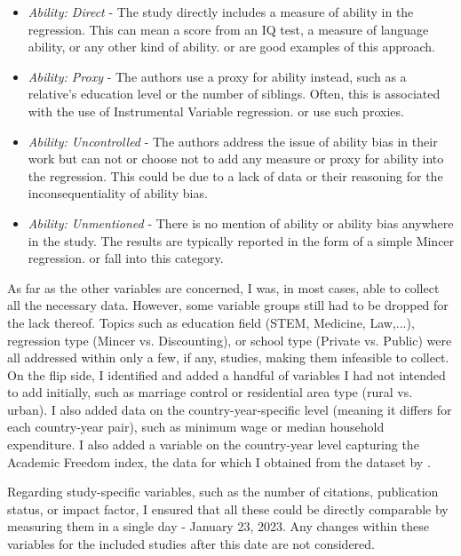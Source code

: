 \begin{itemize}
    \item \textit{Ability: Direct} - The study directly includes a measure of ability in the regression. This can mean a score from an IQ test, a measure of language ability, or any other kind of ability. \cite{grogger1995changes} or \cite{vanpraag2013higher} are good examples of this approach.
    \item \textit{Ability: Proxy} - The authors use a proxy for ability instead, such as a relative's education level or the number of siblings. Often, this is associated with the use of Instrumental Variable regression. \cite{card1995using} or \cite{debrauw2008reconciling} use such proxies.
    \item \textit{Ability: Uncontrolled} - The authors address the issue of ability bias in their work but can not or choose not to add any measure or proxy for ability into the regression. This could be due to a lack of data or their reasoning for the inconsequentiality of ability bias. \citep{angrist1991compulsory, fang2012returns}
    \item \textit{Ability: Unmentioned} - There is no mention of ability or ability bias anywhere in the study. The results are typically reported in the form of a simple Mincer regression. \cite{staiger1997instrumental} or \cite{acemoglu1999} fall into this category.
\end{itemize}


As far as the other variables are concerned, I was, in most cases, able to collect all the necessary data. However, some variable groups still had to be dropped for the lack thereof. Topics such as education field (STEM, Medicine, Law,...), regression type (Mincer vs. Discounting), or school type (Private vs. Public) were all addressed within only a few, if any, studies, making them infeasible to collect. On the flip side, I identified and added a handful of variables I had not intended to add initially, such as marriage control or residential area type (rural vs. urban). I also added data on the country-year-specific level (meaning it differs for each country-year pair), such as minimum wage or median household expenditure. I also added a variable on the country-year level capturing the Academic Freedom index, the data for which I obtained from the dataset by \cite{VDemV13}.

Regarding study-specific variables, such as the number of citations, publication status, or impact factor, I ensured that all these could be directly comparable by measuring them in a single day - January 23, 2023. Any changes within these variables for the included studies after this date are not considered.

